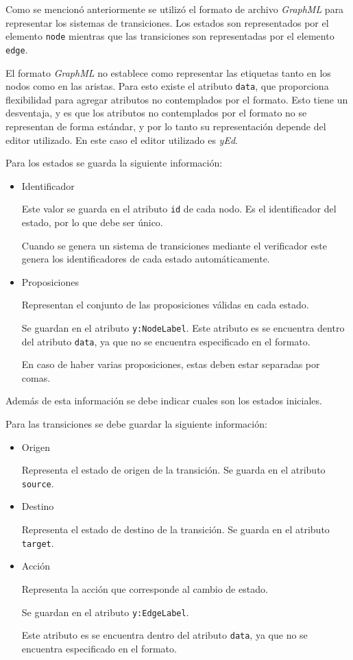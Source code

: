 Como se mencionó anteriormente se utilizó el formato de archivo \textit{GraphML} para
 representar los sistemas de transiciones.
Los estados son representados por el elemento \texttt{node} mientras que las transiciones
 son representadas por el elemento \texttt{edge}.

El formato \textit{GraphML} no establece como representar las etiquetas tanto en los nodos
 como en las aristas.
Para esto existe el atributo \texttt{data}, que proporciona flexibilidad
 para agregar atributos no contemplados por el formato.
Esto tiene un desventaja, y es que los atributos no contemplados por el formato no se
 representan de forma estándar, y por lo tanto su representación depende del editor
 utilizado.
En este caso el editor utilizado es \textit{yEd}.

Para los estados se guarda la siguiente información:
\begin{itemize}
\item Identificador

Este valor se guarda en el atributo \texttt{id} de cada nodo.
Es el identificador del estado, por lo que debe ser único.

Cuando se genera un sistema de transiciones mediante el verificador este genera los identificadores
 de cada estado automáticamente.

\item Proposiciones

Representan el conjunto de las proposiciones válidas en cada estado.

Se guardan en el atributo \texttt{y:NodeLabel}.
Este atributo es se encuentra dentro del atributo \texttt{data}, ya que no se encuentra
 especificado en el formato.

En caso de haber varias proposiciones, estas deben estar separadas por comas.

\end{itemize}

Además de esta información se debe indicar cuales son los estados iniciales.

Para las transiciones se debe guardar la siguiente información:
\begin{itemize}
\item Origen

Representa el estado de origen de la transición. Se guarda en el atributo \texttt{source}.

\item Destino

Representa el estado de destino de la transición. Se guarda en el atributo \texttt{target}.

\item Acción

Representa la acción que corresponde al cambio de estado.

Se guardan en el atributo \texttt{y:EdgeLabel}.

Este atributo es se encuentra dentro del atributo \texttt{data}, ya que no se encuentra
 especificado en el formato.

\end{itemize}

